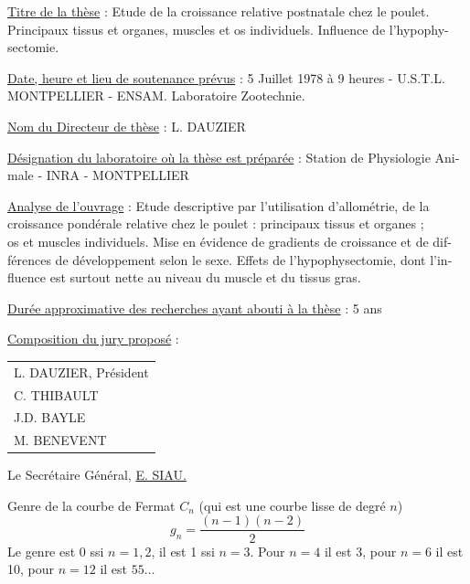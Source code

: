 \uline{Titre de la thèse} : Etude de la croissance relative postnatale chez le poulet.\\
Principaux tissus et organes, muscles et os individuels. Influence de l'hypophy-\\
sectomie.

\uline{Date, heure et lieu de soutenance prévus} : 5 Juillet 1978 à 9 heures - U.S.T.L.\\
MONTPELLIER - ENSAM. Laboratoire Zootechnie.

\uline{Nom du Directeur de thèse} : L. DAUZIER

\uline{Désignation du laboratoire où la thèse est préparée} : Station de Physiologie Ani-\\
male - INRA - MONTPELLIER

\uline{Analyse de l'ouvrage} : Etude descriptive par l'utilisation d'allométrie, de la\\
croissance pondérale relative chez le poulet : principaux tissus et organes ;\\
os et muscles individuels. Mise en évidence de gradients de croissance et de dif-\\
férences de développement selon le sexe. Effets de l'hypophysectomie, dont l'in-\\
fluence est surtout nette au niveau du muscle et du tissus gras.

\uline{Durée approximative des recherches ayant abouti à la thèse} : 5 ans

\uline{Composition du jury proposé} :
\begin{tabular}[t]{l}
L. DAUZIER, Président\\
C. THIBAULT\\
J.D. BAYLE\\
M. BENEVENT
\end{tabular}

Le Secrétaire Général,
\uline{E. SIAU.}

Genre de la courbe de Fermat $C_n$ (qui est une courbe
  lisse de degré $n$)
\[
g_n=\frac{(n-1)(n-2)}2
\]
Le genre est 0 ssi $n=1,2$, il est 1 ssi $n=3$.
Pour $n=4$ il est 3, pour $n=6$ il est 10,
pour $n=12$ il est $55\ldots$

